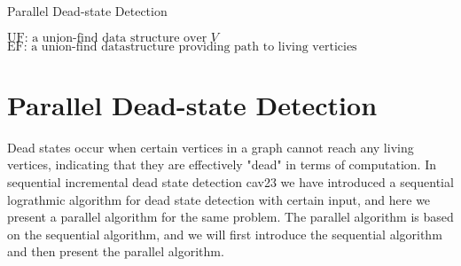 
\begin{algorithm}[H]
    \caption{Parallel Dead-state Detection}
    $\mbox{UF: a union-find data structure over }V$ \\
    $\mbox{EF: a union-find datastructure providing path to living verticies}$ \\
    \label{alg:parallel_dead_state_detection}
\end{algorithm}
\section{Parallel Dead-state Detection}
Dead states occur when certain vertices in a graph cannot reach any living vertices, indicating that they are effectively "dead" in terms of computation. In sequential incremental dead state detection cav23 we have introduced a sequential lograthmic algorithm for dead state detection with certain input, and here we present a parallel algorithm for the same problem. The parallel algorithm is based on the sequential algorithm, and we will first introduce the sequential algorithm and then present the parallel algorithm.

